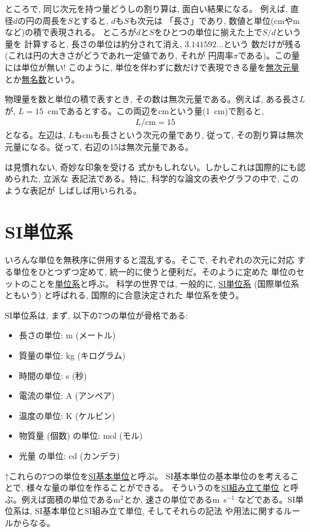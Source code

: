 ところで, 同じ次元を持つ量どうしの割り算は, 面白い結果になる。
例えば, 直径$d$の円の周長を$S$とすると, $d$も$S$も次元は
「長さ」であり, 数値と単位(cmやmなど)の積で表現される。
ところが$d$と$S$をひとつの単位に揃えた上で$S/d$という量を
計算すると, 長さの単位は約分されて消え, $3.141592...$という
数だけが残る(これは円の大きさがどうであれ一定値であり, それが
円周率$\pi$である)。この量には単位が無い! このように, 
単位を伴わずに数だけで表現できる量を\underline{無次元量}
とか\underline{無名数}という。

物理量を数と単位の積で表すとき, その数は無次元量である。例えば, 
ある長さ$L$が, $L=15$~cmであるとする。この両辺をcmという量(1~cm)で割ると, 
\begin{eqnarray}
L/\text{cm} = 15\label{eq:L/cm=15}
\end{eqnarray}
となる。左辺は, $L$もcmも長さという次元の量であり, 従って, 
その割り算は無次元量になる。従って, 右辺の15は無次元量である。

は見慣れない, 奇妙な印象を受ける
式かもしれない。しかしこれは国際的にも認められた, 立派な
表記法である。特に, 科学的な論文の表やグラフの中で, このような表記が
しばしば用いられる。\\


\section{SI単位系}

いろんな単位を無秩序に併用すると混乱する。そこで, それぞれの次元に対応
する単位をひとつずつ定めて, 統一的に使うと便利だ。そのように定めた
単位のセットのことを\underline{単位系}と呼ぶ。
科学の世界では, 一般的に, \underline{SI単位系} (国際単位系ともいう)
と呼ばれる, 国際的に合意決定された
単位系を使う。

SI単位系は, まず, 以下の7つの単位が骨格である:
\begin{itemize}
\item 長さの単位: m (メートル)
\item 質量の単位: kg (キログラム)
\item 時間の単位: s (秒)
\item 電流の単位: A (アンペア)
\item 温度の単位: K (ケルビン)
\item 物質量 (個数) の単位: mol (モル)
\item 光量 の単位: cd (カンデラ)
\end{itemize}
↑これらの7つの単位を\underline{SI基本単位}と呼ぶ。
SI基本単位の基本単位のを考えることで, 様々な量の単位を作ることができる。
そういうのを\underline{SI組み立て単位}
と呼ぶ。例えば面積の単位であるm$^2$とか, 速さの単位であるm~s$^{-1}$
などである。SI単位系は, SI基本単位とSI組み立て単位, そしてそれらの記法
や用法に関するルールからなる。

